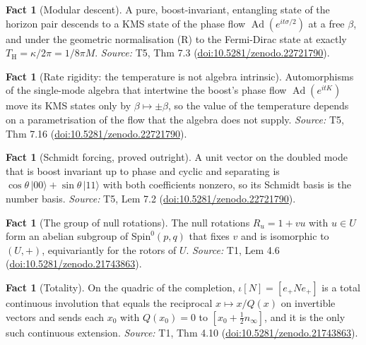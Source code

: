 \documentclass[11pt]{article}
\theoremstyle{definition}
\newtheorem{fact}[theorem]{Fact}
\theoremstyle{plain}
\providecommand{\Spin}{}\renewcommand{\Spin}{\mathrm{Spin}}
\providecommand{\TH}{}\renewcommand{\TH}{T_{\mathrm{H}}}
\providecommand{\nInf}{}\renewcommand{\nInf}{n_\infty}
\begin{document}
\begin{fact}[Modular descent]\label{c:singularity.modular-descent}
A pure, boost-invariant, entangling state of the horizon pair descends to a KMS state of the phase flow $\operatorname{Ad}(e^{it\sigma/2})$ at a free $\beta$, and under the geometric normalisation (R) to the Fermi-Dirac state at exactly $\TH = \kappa/2\pi = 1/8\pi M$.
\emph{Source:} T5, Thm 7.3 (\href{https://doi.org/10.5281/zenodo.22721790}{doi:10.5281/zenodo.22721790}).
\end{fact}

\begin{fact}[Rate rigidity: the temperature is not algebra intrinsic]\label{c:singularity.rate-rigidity-temperature-not-algebra-intrinsic}
Automorphisms of the single-mode algebra that intertwine the boost's phase flow $\operatorname{Ad}(e^{itK})$ move its KMS states only by $\beta \mapsto \pm\beta$, so the value of the temperature depends on a parametrisation of the flow that the algebra does not supply.
\emph{Source:} T5, Thm 7.16 (\href{https://doi.org/10.5281/zenodo.22721790}{doi:10.5281/zenodo.22721790}).
\end{fact}

\begin{fact}[Schmidt forcing, proved outright]\label{c:singularity.schmidt-forcing-proved-outright}
A unit vector on the doubled mode that is boost invariant up to phase and cyclic and separating is $\cos\theta\,|00\rangle + \sin\theta\,|11\rangle$ with both coefficients nonzero, so its Schmidt basis is the number basis.
\emph{Source:} T5, Lem 7.2 (\href{https://doi.org/10.5281/zenodo.22721790}{doi:10.5281/zenodo.22721790}).
\end{fact}

\begin{fact}[The group of null rotations]\label{c:transport.group-null-rotations}
The null rotations $R_u = 1 + vu$ with $u \in U$ form an abelian subgroup of $\Spin^0(p,q)$ that fixes $v$ and is isomorphic to $(U, +)$, equivariantly for the rotors of $U$.
\emph{Source:} T1, Lem 4.6 (\href{https://doi.org/10.5281/zenodo.21743863}{doi:10.5281/zenodo.21743863}).
\end{fact}

\begin{fact}[Totality]\label{c:transport.totality}
On the quadric of the completion, $\iota[N] = [e_+ N e_+]$ is a total continuous involution that equals the reciprocal $x \mapsto x/Q(x)$ on invertible vectors and sends each $x_0$ with $Q(x_0) = 0$ to $[x_0 + \frac12 \nInf]$, and it is the only such continuous extension.
\emph{Source:} T1, Thm 4.10 (\href{https://doi.org/10.5281/zenodo.21743863}{doi:10.5281/zenodo.21743863}).
\end{fact}
\end{document}
